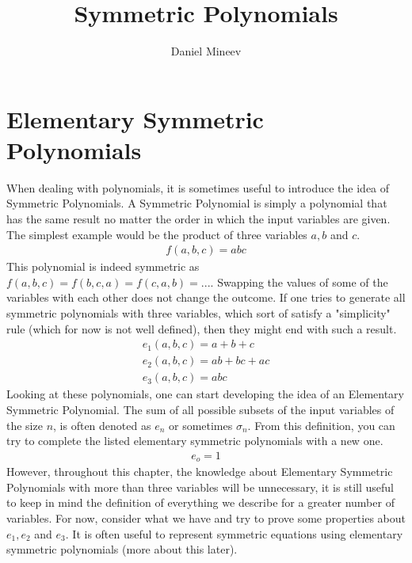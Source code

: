 \documentclass{article}
\title{Symmetric Polynomials}
\author{Daniel Mineev}
\begin{document}
\date{}
\maketitle

\section{Elementary Symmetric Polynomials}

When dealing with polynomials, it is sometimes useful to introduce the idea of Symmetric Polynomials. A Symmetric Polynomial is simply a polynomial that has the same result no matter the order in which the input variables are given. The simplest example would be the product of three variables \(a, b\) and \(c\).
\begin{gather*}
	f(a, b, c) = abc
\end{gather*}
This polynomial is indeed symmetric as \(f(a, b, c) = f(b, c, a) = f(c, a, b) = ...\). Swapping the values of some of the variables with each other does not change the outcome. If one tries to generate all symmetric polynomials with three variables, which sort of satisfy a "simplicity" rule (which for now is not well defined), then they might end with such a result.
\begin{gather*}
	e_1(a, b, c) = a + b + c \\
	e_2(a, b, c) = ab + bc + ac \\
	e_3(a, b, c) = abc
\end{gather*}
Looking at these polynomials, one can start developing the idea of an Elementary Symmetric Polynomial. The sum of all possible subsets of the input variables of the size \(n\), is often denoted as \(e_n\) or sometimes \(\sigma_n\). From this definition, you can try to complete the listed elementary symmetric polynomials with a new one.
\begin{gather*}
	e_o = 1
\end{gather*}
However, throughout this chapter, the knowledge about Elementary Symmetric Polynomials with more than three variables will be unnecessary, it is still useful to keep in mind the definition of everything we describe for a greater number of variables. For now, consider what we have and try to prove some properties about \(e_1, e_2\) and \(e_3\). It is often useful to represent symmetric equations using elementary symmetric polynomials (more about this later).
\end{document}
